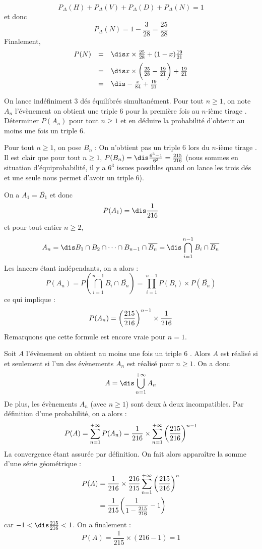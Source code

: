 \documentclass[a4paper,10pt]{report}
\begin{document}
\begin{enumerate}
\begin{enumerate}
\[ P_{\Delta}(H) + P_{\Delta}(V) + P_{\Delta}(D) + P_{\Delta}(N) = 1 \]
et donc 
\[ P_{\Delta}(N) = 1 - \frac{3}{28} = \frac{25}{28} \]
Finalement,
\[ \begin{array}{ccl}
P(N) & = & \dis x \times \frac{25}{28}+ (1-x) \frac{19}{21} \\[0.2cm]
& = & \dis x \times \bigg{(} \frac{25}{28} - \frac{19}{21} \bigg{)} + \frac{19}{21} \\[0.2cm]
& = & \dis - \frac{x}{84} + \frac{19}{21} \\
\end{array}\]
\end{enumerate}
\end{enumerate}


\begin{Exa} On lance indéfiniment 3 dés équilibrés simultanément. Pour tout $n \geq 1$, on note $A_n$ l'évènement \og on obtient une triple 6 pour la première fois au $n$-ième tirage \fg . Déterminer $P(A_n)$ pour tout $n \geq 1$ et en déduire la probabilité d'obtenir au moins une fois un triple $6$.
\end{Exa}

\corr Pour tout $n \geq 1$, on pose $B_n$ : \og On n'obtient pas un triple 6 lors du $n$-ième tirage \fg . Il est clair que pour tout $n \geq 1$, $P(B_n) = \dis \frac{6^3-1}{6^3} = \frac{215}{216}$ (nous sommes en situation d'équiprobabilité, il y a $6^3$ issues possibles quand on lance les trois dés et une seule nous permet d'avoir un triple $6$).

\medskip

\noindent On a $A_1=\overline{B_1}$ et donc 
$$P(A_1) = \dis \frac{1}{216}$$
et pour tout entier $n \geq 2$, 
$$A_n = \dis B_1 \cap B_2 \cap \cdots \cap B_{n-1} \cap \overline{B_n} = \dis \bigcap_{i=1}^{n-1} B_i \cap \overline{B_n}$$
Les lancers étant indépendants, on a alors :
\[ P(A_n) = P(\bigcap_{i=1}^{n-1} B_i \cap \overline{B_n}) = \prod_{i=1}^{n-1} P(B_i) \times P( \overline{B_n})\]
ce qui implique :
\[ P(A_n) = \bigg{(} \frac{215}{216} \bigg{)}^{n-1} \times \frac{1}{216} \]
Remarquons que cette formule est encore vraie pour $n=1$.

\medskip
\noindent Soit $A$ l'évènement \og on obtient au moins une fois un triple $6$ \fg . Alors $A$ est réalisé si et seulement si l'un des évènements $A_n$ est réalisé pour $n \geq 1$. On a donc 
$$A= \dis \bigcup_{n=1}^{+ \infty} A_n$$
De plus, les évènements $A_n$ (avec $n \geq 1$) sont deux à deux incompatibles. Par définition d'une probabilité, on a alors :
\[ P(A) = \sum_{n=1}^{+ \infty} P(A_n) = \frac{1}{216} \times \sum_{n=1}^{+ \infty} \bigg{(} \frac{215}{216} \bigg{)}^{n-1} \]
La convergence étant assurée par définition. On fait alors apparaître la somme d'une série géométrique :
\begin{align*}
P(A) & = \frac{1}{216} \times \frac{216}{215} \sum_{n=1}^{+ \infty} \bigg{(} \frac{215}{216} \bigg{)}^{n} \\
& = \frac{1}{215} \bigg{(} \frac{1}{1-\frac{215}{216}} - 1 \bigg{)} 
\end{align*}
car $-1 < \dis \frac{215}{216} < 1$. On a finalement :
\[ P(A) = \frac{1}{215} \times (216-1) = 1 \]
\end{document}
